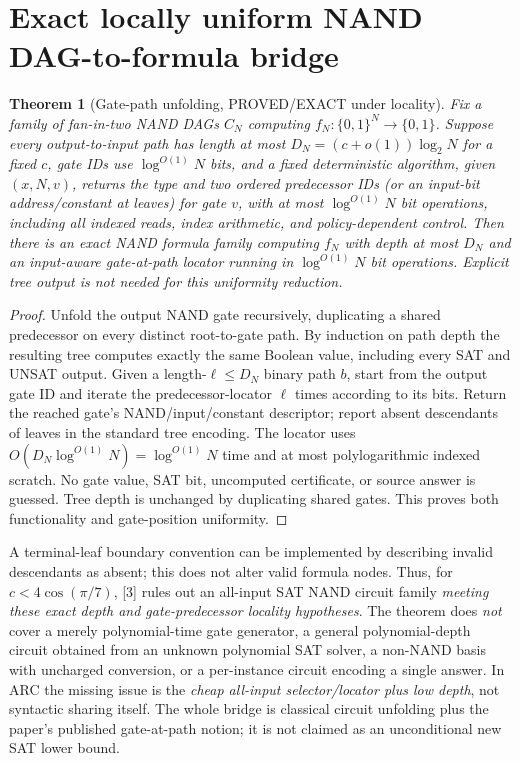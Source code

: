 \documentclass[11pt]{article}
\newtheorem{theorem}{Theorem}
\begin{document}
\section{Exact locally uniform NAND DAG-to-formula bridge}
\begin{theorem}[Gate-path unfolding, PROVED/EXACT under locality]\label{th:gate}
Fix a family of fan-in-two NAND DAGs $C_N$ computing $f_N:\{0,1\}^N\to\{0,1\}$. Suppose every output-to-input path has length at most
$D_N=(c+o(1))\log_2N$ for a fixed $c$, gate IDs use $\log^{O(1)}N$ bits, and a fixed deterministic algorithm, given $(x,N,v)$, returns the type and two ordered predecessor IDs (or an input-bit address/constant at leaves) for gate $v$, with at most $\log^{O(1)}N$ bit operations, \emph{including all indexed reads, index arithmetic, and policy-dependent control}. Then there is an exact NAND \emph{formula} family computing $f_N$ with depth at most $D_N$ and an input-aware gate-at-path locator running in $\log^{O(1)}N$ bit operations. Explicit tree output is \emph{not} needed for this uniformity reduction.
\end{theorem}
\begin{proof}
Unfold the output NAND gate recursively, duplicating a shared predecessor on every distinct root-to-gate path. By induction on path depth the resulting tree computes exactly the same Boolean value, including every SAT and UNSAT output. Given a length-$\ell\le D_N$ binary path $b$, start from the output gate ID and iterate the predecessor-locator $\ell$ times according to its bits. Return the reached gate's NAND/input/constant descriptor; report absent descendants of leaves in the standard tree encoding. The locator uses $O(D_N\log^{O(1)}N)=\log^{O(1)}N$ time and at most polylogarithmic indexed scratch. No gate value, SAT bit, uncomputed certificate, or source answer is guessed. Tree depth is unchanged by duplicating shared gates. This proves both functionality and gate-position uniformity.
\end{proof}
A terminal-leaf boundary convention can be implemented by describing invalid descendants as absent; this does not alter valid formula nodes. Thus, for $c<4\cos(\pi/7)$, [3] rules out an all-input SAT NAND circuit family \emph{meeting these exact depth and gate-predecessor locality hypotheses}. The theorem does \emph{not} cover a merely polynomial-time gate generator, a general polynomial-depth circuit obtained from an unknown polynomial SAT solver, a non-NAND basis with uncharged conversion, or a per-instance circuit encoding a single answer. In ARC the missing issue is the \emph{cheap all-input selector/locator plus low depth}, not syntactic sharing itself. The whole bridge is classical circuit unfolding plus the paper's published gate-at-path notion; it is not claimed as an unconditional new SAT lower bound.
\end{document}
